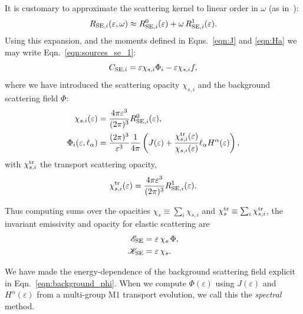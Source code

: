 \documentclass[aps,floatfix,prd,superscriptaddress,twocolumn]{revtex4-1}
\newcommand{\todo}[1]{\marginpar{\tiny{\textcolor{red}{#1}}}}
\begin{document}
It is customary to approximate the scattering kernel to linear order in
$\omega$ (as in~\cite[Eqn.~4.21]{shib2011-truncated_moment}):
\begin{equation}
  \label{eqn:se_kernel_expansion}
  R_{{\rm SE},i}(\varepsilon,\omega) \approx
  R_{{\rm SE},i}^0(\varepsilon) + \omega \, R_{{\rm SE},i}^1(\varepsilon).
\end{equation}
Using this expansion, and the moments defined in Eqns.~\ref{eqn:J}
and \ref{eqn:Ha} we may write Eqn.~\ref{eqn:sources_se_1}:
\begin{equation}
  \label{eqn:sources_se_2}
  C_{{\rm SE},i}
  = \varepsilon \chi_{s,i} \Phi_i - \varepsilon \chi_{s,i} f,
\end{equation}
where we have introduced the scattering opacity $\chi_{s,i}$
and the background scattering field $\Phi$:
\begin{align}
  \label{eqn:opacity_s}
  \chi_{s,i}(\varepsilon)
  &= \frac{4\pi\varepsilon^3}{(2\pi)^3}R_{{\rm SE},i}^0(\varepsilon), \\
  \label{eqn:background_phi}
  \Phi_i(\varepsilon,\ell_\alpha)
  &= \frac{(2\pi)^3}{\varepsilon^3}\frac{1}{4\pi}
  \left(J(\varepsilon)+
  \frac{\chi^{\rm tr}_{s,i}(\varepsilon)}{\chi_{s,i}(\varepsilon)}
  \ell_\alpha H^\alpha(\varepsilon)\right),
\end{align}
with $\chi^{\rm tr}_{s,i}$ the transport scattering opacity,
\todo{drop anisotropic term and defend}
\begin{equation}
  \label{eqn:opacity_s_tr}
  \chi^{\rm tr}_{s,i}(\varepsilon)
  = \frac{4\pi\varepsilon^3}{(2\pi)^3}R_{{\rm SE},i}^1(\varepsilon).
\end{equation}

Thus computing sums over the opacities
$\chi_s\equiv\sum_i\chi_{s,i}$ and
$\chi^{\rm tr}_s\equiv\sum_i\chi^{\rm tr}_{s,i}$,
the invariant emissivity and opacity for elastic scattering are
\begin{align}
  \label{eqn:se_emissivity_summed}
  \mathscr{E}_{\rm SE}
  &= \varepsilon \, \chi_s \, \Phi, \\
  \label{eqn:se_opacity_summed}
  \mathscr{K}_{\rm SE}
  &= \varepsilon \, \chi_s.
\end{align}

We have made the energy-dependence of the background scattering field
explicit in Eqn.~\ref{eqn:background_phi}.
When we compute $\Phi(\varepsilon)$ using $J(\varepsilon)$ and
$H^\alpha(\varepsilon)$ from a multi-group
M1 transport evolution, we call this the \emph{spectral} method.
\end{document}
